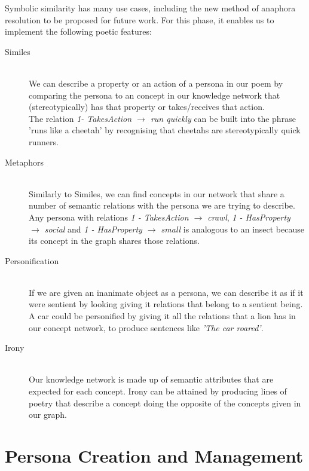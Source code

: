 Symbolic similarity has many use cases, including the new method of anaphora resolution to be proposed for future work. For this phase, it enables us to implement the following poetic features:
\begin{description}
\item[Similes] \hfill \\ We can describe a property or an action of a persona in our poem by comparing the persona to an concept in our knowledge network that (stereotypically) has that property or takes/receives that action. \hfill \\ The relation \textit{1- TakesAction $\rightarrow$ run quickly} can be built into the phrase 'runs like a cheetah' by recognising that cheetahs are stereotypically quick runners.
\item[Metaphors] \hfill \\ Similarly to Similes, we can find concepts in our network that share a number of semantic relations with the persona we are trying to describe. \hfill \\ Any persona with relations \textit{1 - TakesAction $\rightarrow$ crawl}, \textit{1 - HasProperty $\rightarrow$ social} and \textit{1 - HasProperty $\rightarrow$ small} is analogous to an insect because its concept in the graph shares those relations.
\item[Personification] \hfill \\ If we are given an inanimate object as a persona, we can describe it as if it were sentient by looking giving it relations that belong to a sentient being. \hfill \\ A car could be personified by giving it all the relations that a lion has in our concept network, to produce sentences like \textit{'The car roared'}.
\item[Irony] \hfill \\ Our knowledge network is made up of semantic attributes that are expected for each concept. Irony can be attained by producing lines of poetry that describe a concept doing the opposite of the concepts given in our graph.
\end{description}

\section{Persona Creation and Management}
\label{sec:persona}
